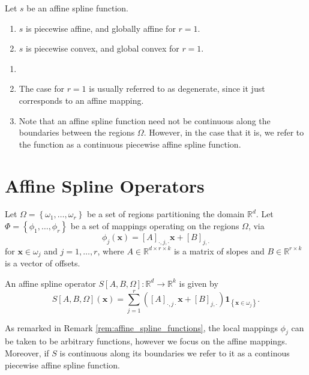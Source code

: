 \begin{proposition}
    Let $s$ be an affine spline function.
    \begin{enumerate}
        \item $s$ is piecewise affine, and globally affine for $r=1$.
        \item $s$ is piecewise convex, and global convex for $r=1$.
    \end{enumerate}
\end{proposition}

\begin{remark}\label{rem:affine_spline_functions}
    \begin{enumerate}
        \item[]
        \item The case for $r=1$ is usually referred to as degenerate, since it just corresponds to an affine mapping.
        \item Note that an affine spline function need not be continuous along the boundaries between the regions $\Omega$. However, in the case that it is, we refer to the function as a continuous piecewise affine spline function.
    \end{enumerate}
\end{remark}

\section{Affine Spline Operators}

Let $\Omega=\left\{\omega_1,\dots,\omega_r\right\}$ be a set of regions partitioning the domain $\mathbb{R}^d$. Let $\Phi=\left\{\phi_1,\dots,\phi_r\right\}$ be a set of mappings operating on the regions $\Omega$, via $$\phi_j(\mathbf{x})=\left[A\right]_{\cdot,j,\cdot}\mathbf{x}+\left[B\right]_{j,\cdot}$$for $\mathbf{x}\in\omega_j$ and $j=1,\dots,r$, where $A\in\mathbb{R}^{d\times r\times k}$ is a matrix of slopes and $B\in\mathbb{R}^{r\times k}$ is a vector of offsets.

\begin{definition}\label{def:affine_spline_operator}
    An affine spline operator $S[A,B,\Omega]:\mathbb{R}^d\to\mathbb{R}^k$ is given by $$S[A,B,\Omega](\mathbf{x})=\sum_{j=1}^r\left([A]_{\cdot,j\cdot}\mathbf{x}+[B]_{j,\cdot}\right)\mathbf{1}_{\left\{\mathbf{x}\in\omega_j\right\}}.$$
\end{definition}

\begin{remark}
    As remarked in Remark \ref{rem:affine_spline_functions}, the local mappings $\phi_j$ can be taken to be arbitrary functions, however we focus on the affine mappings. Moreover, if $S$ is continuous along its boundaries we refer to it as a continous piecewise affine spline function.
\end{remark}

